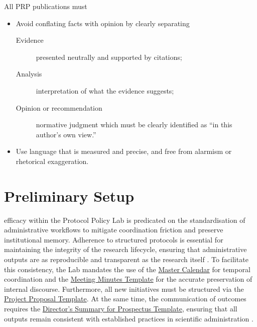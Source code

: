 \documentclass[12pt, a4paper]{article}
\begin{document}
\begin{description}
	      All PRP publications must
	      \begin{itemize}
		      \item Avoid conflating facts with opinion by clearly separating
		            \begin{description}
			            \item[Evidence] presented neutrally and supported by citations;
			            \item[Analysis] interpretation of what the evidence suggests;
			            \item[Opinion or recommendation] normative judgment which must be clearly identified as ``in this author's own view.''
		            \end{description}
		      \item Use language that is measured and precise, and free from alarmism or rhetorical exaggeration.
	      \end{itemize}
\end{description}

\section{Preliminary Setup}
 efficacy within the Protocol Policy Lab is predicated on the standardisation of administrative workflows to mitigate coordination friction and preserve institutional memory. Adherence to structured protocols is essential for maintaining the integrity of the research lifecycle, ensuring that administrative outputs are as reproducible and transparent as the research itself \citep{sandve_ten_2013, peng_reproducible_2011}. To facilitate this consistency, the Lab mandates the use of the \href{https://docs.google.com/document/d/1G5oCMX8XFatLzgqDPwQhQL8WRm1X3_c6qnPlKSOUtlI/edit?tab=t.0#heading=h.fknbpkl3r63c}{Master Calendar} for temporal coordination and the \href{https://docs.google.com/document/d/1G_uVGeUFn-gCMCxsF1tsPbyrPrI1-gZtjvGQvRfeTkU/edit?tab=t.0#heading=h.6w2yvdtb66u5}{Meeting Minutes Template} for the accurate preservation of internal discourse. Furthermore, all new initiatives must be structured via the \href{https://docs.google.com/document/d/1SM7NsaTRETGRu2MyZ23RfOxjCGJVJVoN3rsEuHqDyYI/edit?tab=t.0}{Project Proposal Template}. At the same time, the communication of outcomes requires the \href{https://docs.google.com/document/d/1rq1zVOS8tVxV47zM9dujD1wKn2uE1Cur2b-MFdnZ7qs/edit?tab=t.0}{Director's Summary for Prospectus Template}, ensuring that all outputs remain consistent with established practices in scientific administration \citep{wilson_good_2017}.
\end{document}
